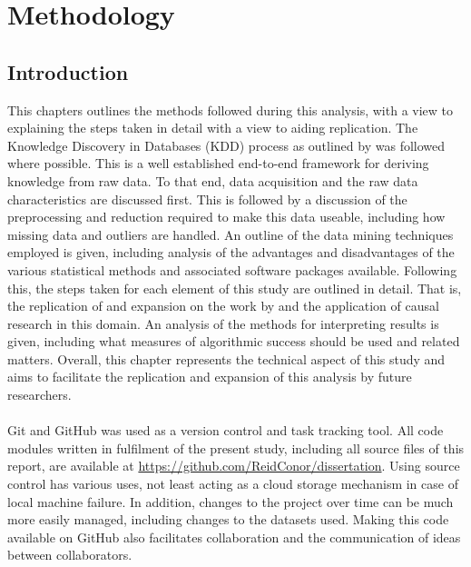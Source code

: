 %
%
%
%

\chapter{Methodology}\label{C.Methodology}
\section{Introduction}
{This chapters outlines the methods followed during this analysis, with a view to explaining the steps taken in detail with a view to aiding replication. The Knowledge Discovery in Databases (KDD) process as outlined by \cite{fayyad1996kdd} was followed where possible. This is a well established end-to-end framework for deriving knowledge from raw data. To that end, data acquisition and the raw data characteristics are discussed first. This is followed by a discussion of the preprocessing and reduction required to make this data useable, including how missing data and outliers are handled. An outline of the data mining techniques employed is given, including analysis of the advantages and disadvantages of the various statistical methods and associated software packages available. Following this, the steps taken for each element of this study are outlined in detail. That is, the replication of and expansion on the work by \cite{moldovan2015learning} and the application of causal research in this domain. An analysis of the methods for interpreting results is given, including what measures of algorithmic success should be used and related matters. Overall, this chapter represents the technical aspect of this study and aims to facilitate the replication and expansion of this analysis by future researchers.} \\\\
{Git and GitHub was used as a version control and task tracking tool. All code modules written in fulfilment of the present study, including all source files of this report, are available at \url {https://github.com/ReidConor/dissertation}. Using source control has various uses, not least acting as a cloud storage mechanism in case of local machine failure. In addition, changes to the project over time can be much more easily managed, including changes to the datasets used. Making this code available on GitHub also facilitates collaboration and the communication of ideas between collaborators.   }
